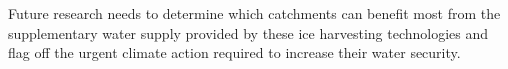 Future research needs to determine which catchments can benefit most from the supplementary water supply
provided by these ice harvesting technologies and flag off the urgent climate action required to increase their
water security.


